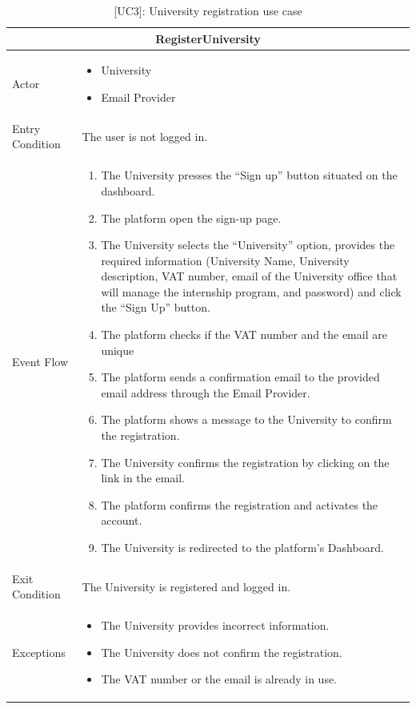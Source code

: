 \begin{table}[H]
    \centering
    \begin{tabular}{|p{3cm}|p{12cm}|}
    \hline
    \multicolumn{2}{|c|}{\textbf{RegisterUniversity}} \\ \hline
    Actor & 
    \begin{itemize}
        \item University
        \item Email Provider
    \end{itemize} \\ \hline
    Entry Condition & The user is not logged in. \\ \hline
    Event Flow &
    \begin{enumerate}         
        \item The University presses the “Sign up” button situated on the dashboard.
        \item The platform open the sign-up page.
        \item The University selects the “University” option, provides the required information (University Name, University description, VAT number, email of the University office that will manage the internship program, and password) and click the “Sign Up” button.
        \item The platform checks if the VAT number and the email are unique
        \item The platform sends a confirmation email to the provided email address through the Email Provider.
        \item The platform shows a message to the University to confirm the registration.
        \item The University confirms the registration by clicking on the link in the email.
        \item The platform confirms the registration and activates the account.
        \item The University is redirected to the platform's Dashboard.
    \end{enumerate} \\ \hline
    Exit Condition & The University is registered and logged in.\\ \hline
    Exceptions &
    \begin{itemize}
        \item The University provides incorrect information.
        \item The University does not confirm the registration.
        \item The VAT number or the email is already in use.
    \end{itemize} \\ \hline
    \end{tabular}
    \caption{[UC3]: University registration use case}
    \label{tab:UC3}
\end{table}

